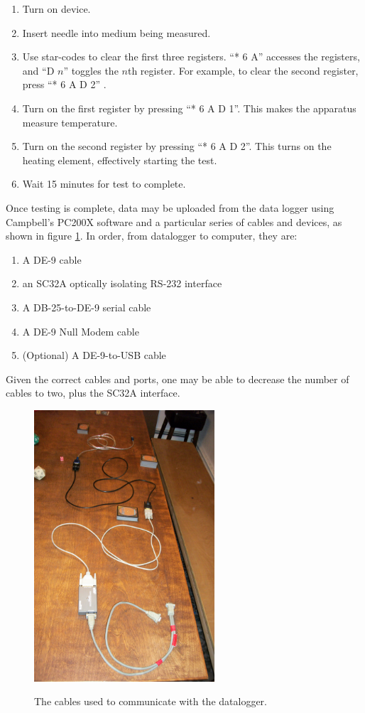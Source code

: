 \begin{enumerate}
\item Turn on device.
\item Insert needle into medium being measured.
\item Use star-codes to clear the first three registers. ``* 6 A'' accesses the
registers, and ``D \(n\)'' toggles the \(n\)th register. For example, to clear
the second register, press ``* 6 A D 2'' .
\item Turn on the first register by pressing ``* 6 A D 1''. This makes the
apparatus measure temperature.
\item Turn on the second register by pressing ``* 6 A D 2''. This turns on the
heating element, effectively starting the test.
\item Wait 15 minutes for test to complete.
\end{enumerate}

Once testing is complete, data may be uploaded from the data logger using
Campbell's PC200X software and a particular series of cables and devices, as
shown in figure \ref{fig:cable}. In order, from datalogger to computer, they
are:


\begin{enumerate}
\item A DE-9 cable
\item an SC32A optically isolating RS-232 interface
\item A DB-25-to-DE-9 serial cable
\item A DE-9 Null Modem cable
\item (Optional) A DE-9-to-USB cable
\end{enumerate}

Given the correct cables and ports, one may be able to decrease the number of
cables to two, plus the SC32A interface.

\begin{figure}[h]
\centering
\includegraphics[width=0.6\textwidth]{fig/cable.jpg}
\label{fig:cable}
\caption{The cables used to communicate with the datalogger.}
\end{figure}

